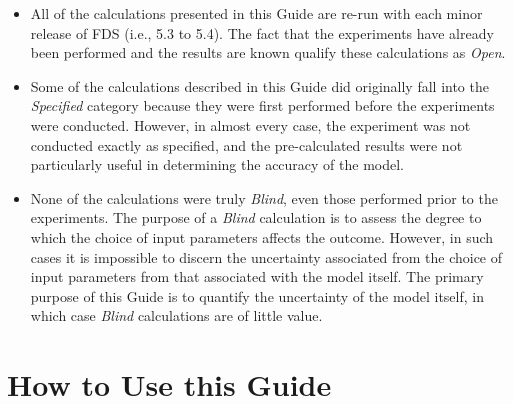 \begin{itemize}
\item All of the calculations presented in this Guide are re-run with each minor release of FDS (i.e., 5.3 to 5.4). The fact that the experiments have already been performed and the results are known qualify these calculations as {\em Open}.
\item Some of the calculations described in this Guide did originally fall into the {\em Specified} category because they were first performed before the experiments were conducted. However, in almost every case, the experiment was not conducted exactly as specified, and the pre-calculated results were not particularly useful in determining the accuracy of the model.
\item None of the calculations were truly {\em Blind}, even those performed prior to the experiments. The purpose of a {\em Blind} calculation is to assess the degree to which the choice of input parameters affects the outcome. However, in such cases it is impossible to discern the uncertainty associated from the choice of input parameters from that associated with the model itself. The primary purpose of this Guide is to quantify the uncertainty of the model itself, in which case {\em Blind} calculations are of little value.
\end{itemize}


\section{How to Use this Guide}


